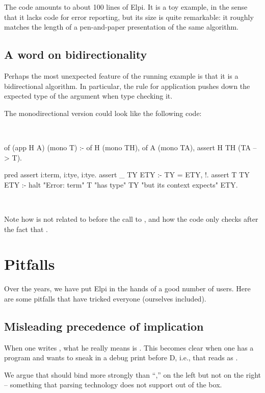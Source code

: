 \documentclass[a4paper, 11pt]{book}
\newenvironment{elpicode}
  {\VerbatimEnvironment~\\\begin{elpibox}\begin{xelpicode}}{\end{xelpicode}
\end{elpibox}\\}
\begin{document}
The code amounts to about 100 lines of Elpi. It is a toy example, in the sense
that it lacks code for error reporting, but its size is quite remarkable: it
roughly matches the length of a pen-and-paper presentation of the same
algorithm.

\subsection{A word on bidirectionality}

Perhaps the most unexpected feature of the running example is that it is a
bidirectional algorithm. In particular, the rule for application pushes down
the expected type of the argument when type checking it.

The monodirectional version could look like the following code:

\begin{elpicode}
of (app H A) (mono T) :-
  of H (mono TH),
  of A (mono TA),
  assert H TH (TA --> T).

pred assert i:term, i:tye, i:tye.
assert _ TY ETY :- TY = ETY, !.
assert T TY ETY :-
  halt "Error: term" T "has type" TY "but its context expects" ETY.
\end{elpicode}

\noindent
Note how  is not related to  before the call to
, and how the code only checks after the fact that
.

\section{Pitfalls}

Over the years, we have put Elpi in the hands of a good number of users. Here
are some pitfalls that have tricked everyone (ourselves included).

\subsection{Misleading precedence of implication}

When one writes , what he really means is .
This becomes clear when one has a program  and wants to sneak in
a debug print before D, i.e.,  that reads as
.

We argue that \elpi{=>} should bind more strongly than ``,'' on the left but
not on the right -- something that parsing technology does not support out of the
box. 
\end{document}
